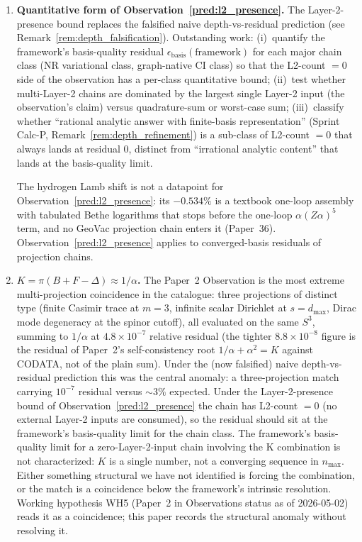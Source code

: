 \documentclass[11pt]{article}
\begin{document}
\begin{enumerate}
\item \textbf{Quantitative form of Observation~\ref{pred:l2_presence}.}
The Layer-2-presence bound replaces the falsified naive
depth-vs-residual prediction (see
Remark~\ref{rem:depth_falsification}).  Outstanding work:
(i)~quantify the framework's basis-quality residual
$\epsilon_\text{basis}(\text{framework})$ for each major chain
class (NR variational class, graph-native CI class) so that the L2-count $= 0$ side of the
observation has a per-class quantitative bound; (ii)~test whether
multi-Layer-2 chains are dominated by the largest single
Layer-2 input (the observation's claim) versus quadrature-sum or
worst-case sum; (iii)~classify whether ``rational analytic answer
with finite-basis representation'' (Sprint Calc-P,
Remark~\ref{rem:depth_refinement}) is a sub-class of L2-count $=
0$ that always lands at residual $0$, distinct from
``irrational analytic content'' that lands at the
basis-quality limit.

The hydrogen Lamb shift is not a datapoint for
Observation~\ref{pred:l2_presence}: its $-0.534\%$ is a textbook
one-loop assembly with tabulated Bethe logarithms that stops before the
one-loop $\alpha(Z\alpha)^5$ term, and no GeoVac projection chain
enters it (Paper~36).  Observation~\ref{pred:l2_presence} applies to
converged-basis residuals of projection chains.

\item \textbf{$K = \pi(B + F - \Delta) \approx 1/\alpha$.}
The Paper~2 Observation is the most extreme multi-projection
coincidence in the catalogue: three projections of distinct type
(finite Casimir trace at $m=3$, infinite scalar
Dirichlet at $s = d_\text{max}$, Dirac mode degeneracy at the
spinor cutoff), all evaluated on the same $S^3$, summing to
$1/\alpha$ at $4.8 \times 10^{-7}$ relative residual (the tighter
$8.8 \times 10^{-8}$ figure is the residual of Paper~2's
self-consistency root $1/\alpha + \alpha^2 = K$ against CODATA, not of
the plain sum).  Under
the (now falsified) naive depth-vs-residual prediction this was
the central anomaly: a three-projection match carrying
$10^{-7}$ residual versus $\sim 3\%$ expected.  Under the
Layer-2-presence bound of Observation~\ref{pred:l2_presence} the
chain has L2-count $= 0$ (no external Layer-2 inputs are consumed),
so the residual should sit at the framework's basis-quality limit
for the chain class.  The framework's basis-quality limit for a
zero-Layer-2-input chain involving the K combination is not
characterized: $K$ is a single number, not a converging sequence
in $n_\text{max}$.  Either something structural we have not
identified is forcing the combination, or the match is a
coincidence below the framework's intrinsic resolution.  Working
hypothesis WH5 (Paper~2 in Observations status as of 2026-05-02)
reads it as a coincidence; this paper records the structural
anomaly without resolving it.


\end{enumerate}
\end{document}
